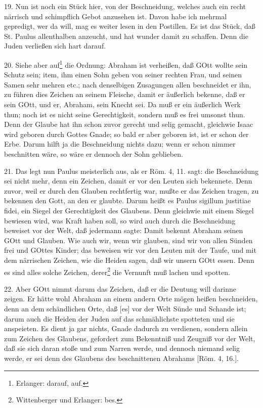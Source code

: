 19. Nun ist noch ein Stück hier, von der Beschneidung, welches auch ein recht närrisch und schimpflich Gebot anzusehen ist. Davon habe ich mehrmal gepredigt, wer da will, mag es weiter lesen in den Postillen. Es ist das Stück, daß St. Paulus allenthalben anzeucht, und hat wunder damit zu schaffen. Denn die Juden verließen sich hart darauf.

20. Siehe aber auf\footnote{Erlanger: darauf, auf.} die Ordnung: Abraham ist verheißen, daß GOtt wollte sein Schutz sein; item, ihm einen Sohn geben von seiner rechten Frau, und seinen Samen sehr mehren etc.; nach denselbigen Zusagungen allen beschneidet er ihn, zu führen dies Zeichen an seinem Fleische, damit er äußerlich bekenne, daß er sein GOtt, und er, Abraham, sein Knecht sei. Da muß er ein äußerlich Werk thun; noch ist es nicht seine Gerechtigkeit, sondern muß es frei umsonst thun. Denn der Glaube hat ihn schon zuvor gerecht und selig gemacht, gleichwie Isaac wird geboren durch Gottes Gnade; so bald er aber geboren ist, ist er schon der Erbe. Darum hilft ja die Beschneidung nichts dazu; wenn er schon nimmer beschnitten wäre, so wäre er dennoch der Sohn geblieben.

21. Das legt nun Paulus meisterlich aus, als er Röm. 4, 11. sagt: die Beschneidung sei nicht mehr, denn ein Zeichen, damit er vor den Leuten sich bekennete. Denn zuvor, weil er durch den Glauben rechtfertig war, mußte er das Zeichen tragen, zu bekennen den Gott, an den er glaubte. Darum heißt es Paulus sigillum justitiae fidei, ein Siegel der Gerechtigkeit des Glaubens. Denn gleichwie mit einem Siegel bewiesen wird, was Kraft haben soll, so wird auch durch die Beschneidung beweiset vor der Welt, daß jedermann sagte: Damit bekennt Abraham seinen GOtt und Glauben. Wie auch wir, wenn wir glauben, sind wir von allen Sünden frei und GOttes Kinder; das beweisen wir vor den Leuten mit der Taufe, und mit dem närrischen Zeichen, wie die Heiden sagen, daß wir unsern GOtt essen. Denn es sind alles solche Zeichen, derer\footnote{Wittenberger und Erlanger: bes.} die Vernunft muß lachen und spotten.

22. Aber GOtt nimmt darum das Zeichen, daß er die Deutung will darinne zeigen. Er hätte wohl Abraham an einem andern Orte mögen heißen beschneiden, denn an dem schändlichen Orte, daß [es] vor der Welt Sünde und Schande ist; darum auch die Heiden der Juden auf das schmählichste spotteten und sie anspeieten. Es dient ja gar nichts, Gnade dadurch zu verdienen, sondern allein zum Zeichen des Glaubens, gefordert zum Bekenntniß und Zeugniß vor der Welt, daß sie sich daran stoße und zum Narren werde, und dennoch niemand selig werde, er sei denn des Glaubens des beschnittenen Abrahams [Röm. 4, 16.].

